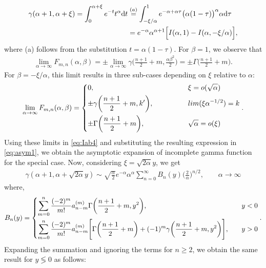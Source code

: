 \documentclass[journal,draftclsnofoot,onecolumn,12pt]{IEEEtran}
\begin{document}
\begin{align} \notag
\gamma(\alpha+1, \alpha+\xi) = \int_0^{\alpha+\xi} e^{-t}t^{\alpha} {\rm d}t &\stackrel{(a)}{=} \int_{-\xi/\alpha}^1 e^{-\alpha+\alpha\tau} \big(\alpha(1-\tau)\big)^{\alpha} \alpha {\rm d} \tau \\ \label{eq:asym1}
&= e^{-\alpha}\alpha^{\alpha+1}\Big[ I(\alpha,1) - I(\alpha, -\xi/\alpha) \Big],
\end{align}
where (a) follows from the substitution $t = \alpha(1-\tau)$.
For $\beta =1$, we observe that 
\begin{align*}
\lim_{\alpha \to \infty} F_{m,n} (\alpha, \beta) = \pm \lim_{\alpha \to \infty} \gamma \bigg(\frac{n+1}{2}+m, \frac{\alpha\beta^2}{2} \bigg) = \pm \Gamma\bigg(\frac{n+1}{2}+m\bigg).
\end{align*}
For $\beta = -\xi/\alpha$, this limit results in three sub-cases depending on $\xi$ relative to $\alpha$:
\begin{align*}
\lim_{\alpha \to \infty} F_{m,n}(\alpha, \beta) = \begin{dcases}
0, \qquad \qquad & \xi = o(\sqrt{\alpha}) \\
\pm \gamma\bigg(\frac{n+1}{2}+m,k'\bigg), \qquad \qquad & lim(\xi \alpha^{-1/2}) = k \\
\pm \Gamma\bigg(\frac{n+1}{2}+m\bigg), \qquad \qquad & \sqrt{\alpha} = o(\xi) 
\end{dcases}.
\end{align*}
Using these limits in \eqref{eq:Iab4} and substituting the resulting expression in \eqref{eq:asym1}, we obtain the asymptotic expansion of incomplete gamma function for the special case.
Now, considering $\xi = \sqrt{2\alpha}y$, we get
\begin{align}
\gamma(\alpha+1,\alpha+\sqrt{2\alpha}y) \sim \sqrt{\frac{\alpha}{2}}e^{-\alpha} \alpha^{\alpha} \sum_{n=0}^\infty B_n(y)\Big(\frac{2}{\alpha}\Big)^{n/2}, \qquad \alpha \to \infty 
\end{align}
where,
\begin{align}
B_n(y) = \begin{dcases}
\sum_{m=0}^n \frac{(-2)^m}{m!}a_{n-m}^{(m)} \Gamma\bigg(\frac{n+1}{2}+m, y^2\bigg), \quad &y<0 \\
\sum_{m=0}^n \frac{(-2)^m}{m!}a_{n-m}^{(m)} \Bigg[\Gamma\bigg(\frac{n+1}{2}+m\bigg)+(-1)^m\gamma\bigg(\frac{n+1}{2}+m, y^2\bigg)\Bigg], \quad &y>0 
\end{dcases}.
\end{align}
Expanding the summation and ignoring the terms for $n\geq 2$, we obtain the same result for $y \lessgtr 0$ as follows:
\end{document}
